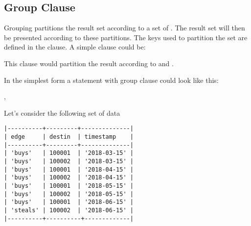 
\subsection{Group Clause}\label{sec_group}
Grouping partitions the result set
according to a set of .
The result set will then be presented
according to these partitions.
The keys used to partition the set
are defined in the  clause.
A simple \term{group} clause could be:

 

This clause would partition the result
according to  and .

In the simplest form a statement with
group clause could look like this:

 ,
 
 

Let's consider the following set of data

\begin{minipage}{\textwidth}
\begin{verbatim}
|----------+---------+--------------|
| edge     | destin  | timestamp    |
|----------+---------+--------------|
| 'buys'   | 100001  | '2018-03-15' |
| 'buys'   | 100002  | '2018-03-15' |
| 'buys'   | 100001  | '2018-04-15' |
| 'buys'   | 100002  | '2018-04-15' |
| 'buys'   | 100001  | '2018-05-15' |
| 'buys'   | 100002  | '2018-05-15' |
| 'buys'   | 100001  | '2018-06-15' |
| 'steals' | 100002  | '2018-06-15' |
|----------+----------+-------------|
\end{verbatim}
\end{minipage}

